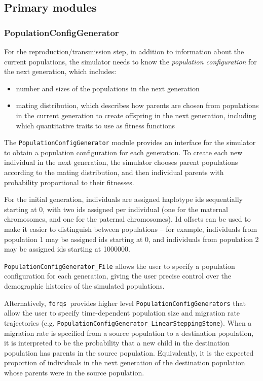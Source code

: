 \documentclass{article}
\newcommand{\forqs}[0]{\texttt{forqs }}
\begin{document}
\subsection{Primary modules}
\label{subsection_primary_modules}

\subsubsection{PopulationConfigGenerator}

For the reproduction/transmission step, in addition to information about the current
populations, the simulator needs to know the \emph{population configuration}
for the next generation, which includes:
\begin{itemize} 
    \item number and sizes of the populations in the next generation 
    \item mating distribution, which describes how parents are chosen from populations in the
          current generation to create offspring in the next generation, including which
          quantitative traits to use as fitness functions
\end{itemize}
The \texttt{Population\-Config\-Generator} module provides an interface for the
simulator to obtain a population configuration for each generation.  To create
each new individual in the next generation, the simulator chooses parent
populations according to the mating distribution, and then individual parents
with probability proportional to their fitnesses.

For the initial generation, individuals are assigned haplotype ids sequentially
starting at 0, with two ids assigned per individual (one for the maternal
chromosomes, and one for the paternal chromosomes).  Id offsets can be used
to make it easier to distinguish between populations -- for example, individuals
from population 1 may be assigned ids starting at 0, and individuals from
population 2 may be assigned ids starting at 1000000.

\texttt{Population\-Config\-Generator\-\_File} allows the user to specify a population
configuration for each generation, giving the user precise control over the
demographic histories of the simulated populations.

Alternatively, \forqs provides higher level \texttt{PopulationConfigGenerators}
that allow the user to specify time-dependent population size and migration
rate trajectories (e.g.
\texttt{Population\-Config\-Generator\_LinearStepping\-Stone}).  When a
migration rate is specified from a source population to a destination
population, it is interpreted to be the probability that a new child in the
destination population has parents in the source population.  Equivalently, it
is the expected proportion of individuals in the next generation of the
destination population whose parents were in the source population.
\end{document}

